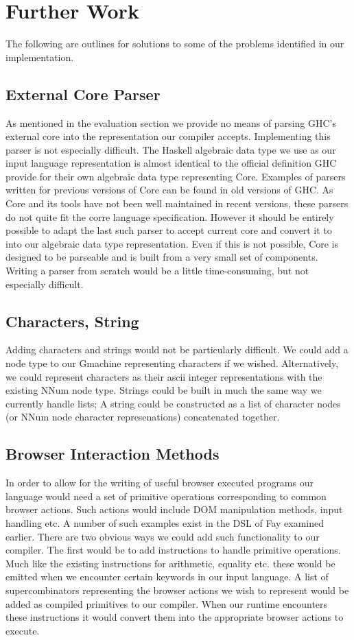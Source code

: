 \section{Further Work}
The following are outlines for solutions to some of
the problems identified in our implementation.

\subsection{External Core Parser}
As mentioned in the evaluation section we provide no means of
parsing GHC's external core into the representation our compiler accepts.
Implementing this parser is not especially difficult. The Haskell
algebraic data type we use as our input language representation is
almost identical to the official definition GHC provide
for their own algebraic data type representing Core. Examples of
parsers written for previous versions of Core can be found in old
versions of GHC. As Core and its tools have not been well maintained 
in recent versions, these parsers do not quite fit the corre language
specification. However it should be entirely possible to adapt the 
last such parser to accept current core and convert it to into our 
algebraic data type representation. Even if this is not possible, Core
is designed to be parseable and is built from a very small set of 
components. Writing a parser from scratch would be a little 
time-consuming, but not especially difficult.

\subsection{Characters, String}
Adding characters and strings would not be particularly difficult.
We could add a node type to our Gmachine representing characters if
we wished. Alternatively, we could represent characters as their
ascii integer representations with the existing NNum node type. 
Strings could be built in much the same way we currently handle
lists; A string could be constructed as a list of character nodes
(or NNum node character represenations) concatenated together. 

\subsection{Browser Interaction Methods}
In order to allow for the writing of useful browser executed programs
our language would need a set of primitive operations corresponding
to common browser actions. Such actions would include DOM manipulation
methods, input handling etc. A number of such examples exist in the
DSL of Fay examined earlier. There are two obvious ways we could add such 
functionality to our compiler. The first would be to add instructions to
handle primitive operations. Much like the existing instructions for
arithmetic, equality etc. these would be emitted when we encounter 
certain keywords in our input language. A list of supercombinators
representing the browser actions we wish to represent would be added
as compiled primitives to our compiler. When our runtime encounters
these instructions it would convert them into the appropriate browser
actions to execute. 

